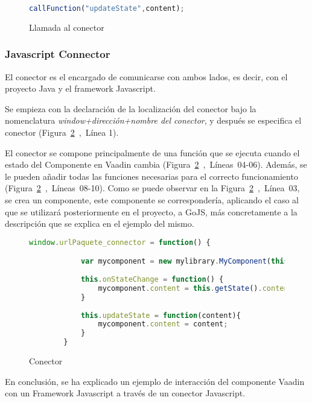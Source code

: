 \begin{figure}[!tb]
	\centering
	\begin{lstlisting}[language=JavaScript]
	callFunction("updateState",content);
	\end{lstlisting}
	\caption{Llamada al conector}
	\label{fig:callfunction}
\end{figure}
 			
 			
 			
 	\subsubsection{Javascript Connector}	
 	
 	
 	El conector es el encargado de comunicarse con ambos lados, es decir, con el proyecto Java y el framework Javascript.
 	
 	Se empieza con la declaración de la localización del conector bajo la nomenclatura \emph{window+dirección+nombre del conector}, y después se especifica el conector (Figura~\ref{fig:conectorDesc}~,~Línea 1).
 	
 	El conector se compone principalmente de una función que se ejecuta cuando el estado del Componente en Vaadin cambia (Figura~\ref{fig:conectorDesc}~,~Líneas~04-06). Además, se le pueden añadir todas las funciones necesarias para el correcto funcionamiento (Figura~\ref{fig:conectorDesc}~,~Líneas~08-10). Como se puede observar en la Figura~\ref{fig:conectorDesc}~,~Línea~03, se crea un componente, este componente se correspondería, aplicando el caso al que se utilizará posteriormente en el proyecto, a GoJS, más concretamente a la descripción que se explica en el ejemplo del mismo.
 	
 	
 	\begin{figure}[!tb]
 		\centering
 		\begin{lstlisting}[language=JavaScript]
 		window.urlPaquete_connector = function() {

 			var mycomponent = new mylibrary.MyComponent(this.getElement());
		 	
		 	this.onStateChange = function() {
		 		mycomponent.content = this.getState().content;
		 	}
		 	
		 	this.updateState = function(content){
		 		mycomponent.content = content;
		 	}
	 	}
 		\end{lstlisting}
 		\caption{Conector}
 		\label{fig:conectorDesc}
 	\end{figure}

	En conclusión, se ha explicado un ejemplo de interacción del componente Vaadin con un Framework Javascript a través de un conector Javascript.
 	
 	
 	
 			
